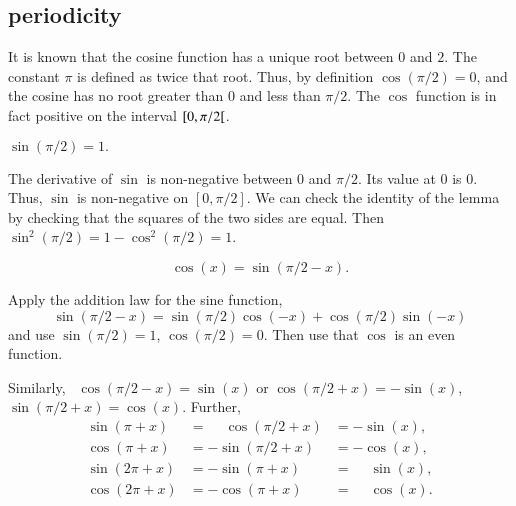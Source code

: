 \subsection{periodicity}
\label{sec:pi}

It is known that the cosine function has a unique root between $0$
and $2$. The constant $\pi$ is defined as twice that root.  Thus, by
definition $\cos(\pi/2) = 0$, and the cosine has no root greater
than $0$ and less than $\pi/2$. The $\cos$ function is in fact
positive on the interval $[ 0,\pi/2[$.

\begin{lemma}\label{lemma:sin-pi2}
    $\sin (\pi/2) = 1.$
\end{lemma}

\begin{proved}
The derivative of $\sin$ is non-negative between $0$ and $\pi/2$.
Its value at $0$ is $0$.  Thus, $\sin$ is non-negative on
$[0,\pi/2]$.  We can check the identity of the lemma by checking
that the squares of the two sides are equal. Then $\sin^2(\pi/2) =
{1-\cos^2(\pi/2)} = 1$.
\swallowed\end{proved}

\begin{lemma}\label{lemma:cos-sin}
    $$\cos(x) = \sin(\pi/2 - x).$$
\end{lemma}

\begin{proved}
    Apply the addition law for the sine function,
    $$\sin(\pi/2 - x) = \sin(\pi/2)\cos(-x) + \cos(\pi/2)\sin(-x)$$
    and use
    $\sin(\pi/2) = 1$, $\cos(\pi/2) = 0$.  Then use that $\cos$ is
    an even function.
\swallowed\end{proved}

Similarly,~%
%
$\cos(\pi/2 - x) = \sin(x)$ or $\cos(\pi/2 + x) =
-\sin(x)$, $\sin(\pi/2 + x) = \cos(x)$.  Further,
    $$\begin{array}{lll}
      \sin(\pi + x) &= \phantom{-}\cos(\pi/2 + x) &= -\sin(x),\\
      \cos(\pi + x) &= -\sin(\pi/2 + x) &= -\cos(x),\\
      \sin(2\pi + x) &= -\sin(\pi + x) &= \phantom{-}\sin(x),\\
      \cos(2\pi + x) &= -\cos(\pi + x) &= \phantom{-}\cos(x).
      \end{array}$$


